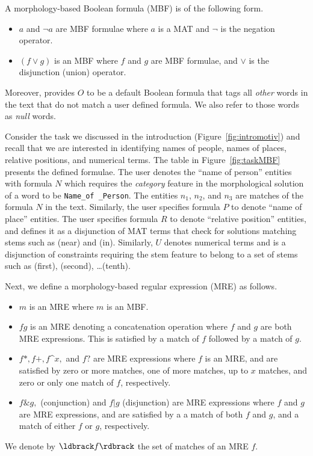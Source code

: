 A morphology-based Boolean formula (MBF) is of the following form.
\begin{itemize}
  \item $a$ and $\neg a$ are MBF formulae where $a$ is a MAT and $\neg$ is the negation operator. 
  \item $(f \vee g)$ is an MBF where $f$ and $g$ are MBF formulae, 
    and $\vee$ is the disjunction (union) operator. 
\end{itemize}

Moreover, \framework provides $O$ to be a default Boolean formula that tags all {\em other} words in the text that do not match a user defined formula.
We also refer to those words as {\em null} words.



Consider the task we discussed in the introduction (Figure~\ref{fig:intromotiv}) 
and recall that we are interested in identifying names of people, names of places, relative positions, and numerical terms.
The table in Figure~\ref{fig:taskMBF} presents the defined formulae.
The user denotes the ``name of person'' entities with formula $N$ 
which requires the {\em category} feature in the morphological solution of a word to be {\tt Name\_of \_Person}.
The entities $n_1$, $n_2$, and $n_3$ are matches of the formula $N$ in the text.
Similarly, the user specifies formula $P$ to denote ``name of place'' entities. 
The user specifies formula $R$ to denote ``relative position'' entities, 
and defines it as a disjunction of MAT terms that check for 
solutions matching stems such as  (near) and  (in).
Similarly, $U$ denotes numerical terms and is a disjunction of constraints 
requiring the stem feature to belong to a set of stems such as
(first), (second), \dots {}(tenth).


Next, we define a morphology-based regular expression (MRE) as follows.
\begin{itemize}
\item $m$ is an MRE where $m$ is an MBF.
\item $fg$ is an MRE denoting a concatenation operation
  where $f$ and $g$ are both MRE expressions. This is 
  satisfied by a match of $f$ followed by a match of $g$. 
\item $f*,f+,f$\textasciicircum$x,$ and $f?$ are MRE expressions where $f$ is an MRE,
  and are satisfied by zero or more matches, one of more matches, up to $x$ matches, 
  and zero or only one match of $f$, respectively.
\item $f\& g,$ (conjunction) and $f|g$ (disjunction) are  MRE expressions where 
  $f$ and $g$ are MRE expressions, and are satisfied by a 
  a match of both $f$ and $g$, 
  and a match of either $f$ or $g$, respectively. 
\end{itemize}
We denote by $\ldbrack f\rdbrack$ the set of matches of an MRE $f$.

